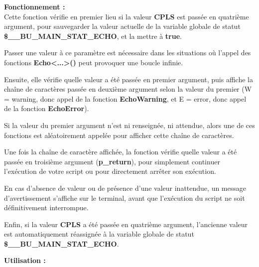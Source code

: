\documentclass[a4paper,10pt]{article}
\begin{document}
\begin{justify}
    \textbf{Fonctionnement :}\\
    Cette fonction vérifie en premier lieu si la valeur \textbf{CPLS} est passée en quatrième argument, pour sauvegarder la valeur actuelle de la variable globale de statut \textbf{\color{orange}\$\_\_BU\_MAIN\_STAT\_ECHO}, et la mettre à \textbf{true}.
\end{justify}

\begin{justify}
    Passer une valeur à ce paramètre est nécessaire dans les situations où l'appel des fonctions \textbf{\color{mauve}Echo<...>()} peut provoquer une boucle infinie.
\end{justify}

\begin{justify}    
    Ensuite, elle vérifie quelle valeur a été passée en premier argument, puis affiche la chaîne de caractères passée en deuxième argument selon la valeur du premier (W = warning, donc appel de la fonction \textbf{\color{mauve}EchoWarning}, et E = error, donc appel de la fonction \textbf{\color{mauve}EchoError}).
\end{justify}

\begin{justify}
    Si la valeur du premier argument n'est ni renseignée, ni attendue, alors une de ces fonctions est aléatoirement appelée pour afficher cette chaîne de caractères.
\end{justify}

\begin{justify}
    Une fois la chaîne de caractère affichée, la fonction vérifie quelle valeur a été passée en troisième argument (\textbf{\color{orange}p\_return}), pour simplement continuer l'exécution de votre script ou pour directement arrêter son exécution.
\end{justify}

\begin{justify}
    En cas d'absence de valeur ou de présence d'une valeur inattendue, un message d'avertissement s'affiche sur le terminal, avant que l'exécution du script ne soit définitivement interrompue.
\end{justify}

\begin{justify}
    Enfin, si la valeur \textbf{CPLS} a été passée en quatrième argument, l'ancienne valeur est automatiquement réassignée à la variable globale de statut \textbf{\color{orange}\$\_\_BU\_MAIN\_STAT\_ECHO}.
\end{justify}

\begin{justify}
    \textbf{Utilisation :}
\end{justify}
\end{document}
